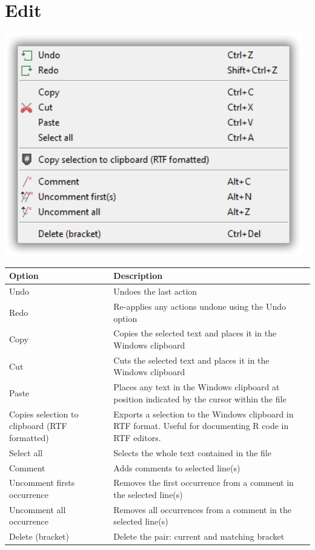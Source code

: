 
\hypertarget{menu_edit}{}
\section{Edit}

\includegraphics[scale=0.50]{./res/menu_edit.png}\\

\begin{scriptsize}
  \begin{tabularx}{\textwidth}{>{\hsize=0.4\hsize}X>{\hsize=0.7\hsize}X}\\
    \hline
    \textbf{Option} & \textbf{Description} \\
    \hline
    Undo & Undoes the last action \\
    Redo & Re-applies any actions undone using the Undo option \\
    Copy & Copies the selected text and places it in the Windows clipboard \\
    Cut & Cuts the selected text and places it in the Windows clipboard \\
    Paste & Places any text in the Windows clipboard at position indicated by the cursor within the file \\
    Copies selection to clipboard (RTF formatted) & Exports a selection to the Windows clipboard in RTF format. Useful for documenting R code in RTF editors. \\
    Select all & Selects the whole text contained in the file \\
    Comment & Adds comments to selected line(s) \\
    Uncomment firsts occurrence & Removes the first occurrence from a comment in the selected line(s) \\
    Uncomment all occurrence & Removes all occurrences from a comment in the selected line(s) \\
    Delete (bracket) & Delete the pair: current and matching bracket \\
    \hline
  \end{tabularx}
\end{scriptsize}
